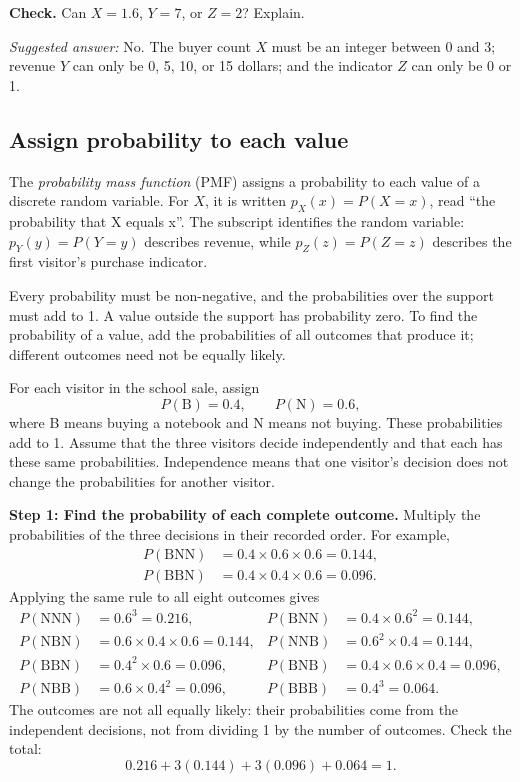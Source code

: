 \textbf{Check.} Can $X=1.6$, $Y=7$, or $Z=2$? Explain.

\emph{Suggested answer:} No. The buyer count $X$ must be an integer between 0 and 3; revenue $Y$ can only be 0, 5, 10, or 15 dollars; and the indicator $Z$ can only be 0 or 1.


\subsection{Assign probability to each value}

The \emph{probability mass function} (PMF) assigns a probability to each value of a discrete random variable. For $X$, it is written $p_X(x)=P(X=x)$, read ``the probability that X equals x''. The subscript identifies the random variable: $p_Y(y)=P(Y=y)$ describes revenue, while $p_Z(z)=P(Z=z)$ describes the first visitor's purchase indicator.

Every probability must be non-negative, and the probabilities over the support must add to 1. A value outside the support has probability zero. To find the probability of a value, add the probabilities of all outcomes that produce it; different outcomes need not be equally likely.

For each visitor in the school sale, assign
\[
P(\mathrm{B})=0.4,\qquad P(\mathrm{N})=0.6,
\]
where B means buying a notebook and N means not buying. These probabilities add to 1. Assume that the three visitors decide independently and that each has these same probabilities. Independence means that one visitor's decision does not change the probabilities for another visitor.

\textbf{Step 1: Find the probability of each complete outcome.} Multiply the probabilities of the three decisions in their recorded order. For example,
\[
\begin{aligned}
P(\mathrm{BNN})&=0.4\times0.6\times0.6=0.144,\\
P(\mathrm{BBN})&=0.4\times0.4\times0.6=0.096.
\end{aligned}
\]
Applying the same rule to all eight outcomes gives
\[
\begin{aligned}
	P(\mathrm{NNN})&=0.6^3=0.216, & P(\mathrm{BNN})&=0.4\times0.6^2=0.144,\\
	P(\mathrm{NBN})&=0.6\times0.4\times0.6=0.144, & P(\mathrm{NNB})&=0.6^2\times0.4=0.144,\\
	P(\mathrm{BBN})&=0.4^2\times0.6=0.096, & P(\mathrm{BNB})&=0.4\times0.6\times0.4=0.096,\\
	P(\mathrm{NBB})&=0.6\times0.4^2=0.096, & P(\mathrm{BBB})&=0.4^3=0.064.
\end{aligned}
\]
The outcomes are not all equally likely: their probabilities come from the independent decisions, not from dividing 1 by the number of outcomes. Check the total:
\[
0.216+3(0.144)+3(0.096)+0.064=1.
\]

